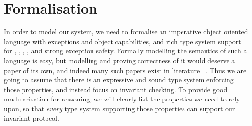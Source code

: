\saveSpace
\section{Formalisation}
\label{s:meaning}
\saveSpace
In order to model our system, we need to formalise an imperative object oriented language
with exceptions and object capabilities,  and rich type system
support for \Q@mut@, \Q@imm@, \Q@read@, \Q@capsule@, and strong exception safety.
Formally modelling the semantics of such a language is easy, but 
modelling and proving correctness of it would deserve a paper
of its own, and indeed many such papers exist in literature%
~\cite{ServettoEtAl13a,ServettoZucca15,GordonEtAl12,clebsch2015deny,JOT:issue_2011_01/article1}.
Thus we are going to assume that there is an expressive and sound type system enforcing
those properties, and instead focus on invariant checking.
To provide good modularisation for reasoning, 
we will clearly list the properties we need to rely upon, so that \emph{every} type
system supporting those properties can support our invariant protocol.

